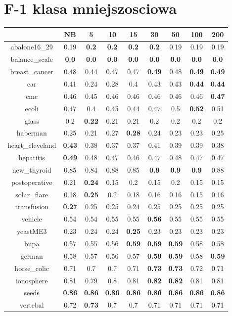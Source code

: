 \documentclass{article}%
\begin{document}
%
\section*{F{-}1 klasa mniejszosciowa}%
\begin{tabular}{c|cccccccc}%
\hline%
&NB&5&10&15&30&50&100&200\\%
\hline%
abalone16\_29&0.19&\textbf{0.2}&\textbf{0.2}&\textbf{0.2}&\textbf{0.2}&0.19&0.19&0.19\\%
\hline%
balance\_scale&\textbf{0.0}&\textbf{0.0}&\textbf{0.0}&\textbf{0.0}&\textbf{0.0}&\textbf{0.0}&\textbf{0.0}&\textbf{0.0}\\%
\hline%
breast\_cancer&0.48&0.44&0.47&0.47&\textbf{0.49}&0.48&\textbf{0.49}&\textbf{0.49}\\%
\hline%
car&0.41&0.24&0.28&0.4&0.43&0.43&\textbf{0.44}&\textbf{0.44}\\%
\hline%
cmc&0.46&0.45&0.46&0.46&0.46&0.46&0.46&\textbf{0.47}\\%
\hline%
ecoli&0.47&0.4&0.45&0.44&0.47&0.5&\textbf{0.52}&0.51\\%
\hline%
glass&0.2&\textbf{0.22}&0.21&0.21&0.2&0.2&0.2&0.2\\%
\hline%
haberman&0.25&0.21&0.27&\textbf{0.28}&0.24&0.23&0.23&0.25\\%
\hline%
heart\_cleveland&\textbf{0.43}&0.38&0.37&0.37&0.41&0.39&0.39&0.38\\%
\hline%
hepatitis&\textbf{0.49}&0.48&0.47&0.46&0.47&0.48&0.47&0.47\\%
\hline%
new\_thyroid&0.85&0.84&0.88&0.85&\textbf{0.9}&\textbf{0.9}&\textbf{0.9}&0.88\\%
\hline%
postoperative&0.21&\textbf{0.24}&0.15&0.2&0.15&0.2&0.15&0.15\\%
\hline%
solar\_flare&0.18&\textbf{0.25}&0.2&0.18&0.16&0.16&0.15&0.16\\%
\hline%
transfusion&\textbf{0.27}&0.25&0.25&0.24&0.25&0.25&0.25&0.25\\%
\hline%
vehicle&0.54&0.54&0.55&0.55&\textbf{0.56}&0.55&0.55&0.55\\%
\hline%
yeastME3&0.23&0.24&0.24&\textbf{0.25}&0.23&0.23&0.23&0.23\\%
\hline%
bupa&0.57&0.55&0.56&\textbf{0.59}&\textbf{0.59}&\textbf{0.59}&0.58&0.58\\%
\hline%
german&0.58&0.57&0.56&0.57&\textbf{0.59}&\textbf{0.59}&0.58&\textbf{0.59}\\%
\hline%
horse\_colic&0.71&0.7&0.7&0.71&\textbf{0.73}&\textbf{0.73}&0.72&0.71\\%
\hline%
ionosphere&0.81&0.79&0.8&0.81&\textbf{0.82}&\textbf{0.82}&0.81&0.81\\%
\hline%
seeds&\textbf{0.86}&\textbf{0.86}&\textbf{0.86}&\textbf{0.86}&\textbf{0.86}&\textbf{0.86}&\textbf{0.86}&\textbf{0.86}\\%
\hline%
vertebal&0.72&\textbf{0.73}&0.7&0.7&0.71&0.71&0.71&0.71\\%
\hline%
\end{tabular}
\end{document}
